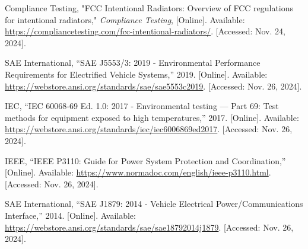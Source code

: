 \begin{thebibliography}{45}
	Compliance Testing, "FCC Intentional Radiators: Overview of FCC regulations for intentional radiators," \textit{Compliance Testing}, [Online]. Available: \url{https://compliancetesting.com/fcc-intentional-radiators/}. [Accessed: Nov. 24, 2024].
	
	SAE International, ``SAE J5553/3: 2019 - Environmental Performance Requirements for Electrified Vehicle Systems,'' 2019. [Online]. Available: \url{https://webstore.ansi.org/standards/sae/sae5553c2019}. [Accessed: Nov. 26, 2024].
	
	IEC, ``IEC 60068-69 Ed. 1.0: 2017 - Environmental testing — Part 69: Test methods for equipment exposed to high temperatures,'' 2017. [Online]. Available: \url{https://webstore.ansi.org/standards/iec/iec6006869ed2017}. [Accessed: Nov. 26, 2024].
	
	IEEE, ``IEEE P3110: Guide for Power System Protection and Coordination,'' [Online]. Available: \url{https://www.normadoc.com/english/ieee-p3110.html}. [Accessed: Nov. 26, 2024].
	
	SAE International, ``SAE J1879: 2014 - Vehicle Electrical Power/Communications Interface,'' 2014. [Online]. Available: \url{https://webstore.ansi.org/standards/sae/sae18792014j1879}. [Accessed: Nov. 26, 2024].
	
\end{thebibliography}
